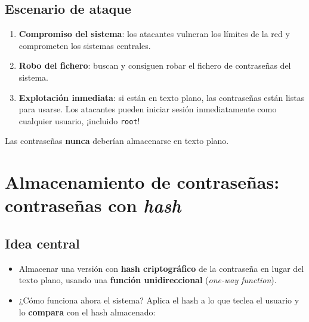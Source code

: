 \documentclass[11pt,a4paper]{report}
\begin{document}
\subsection{Escenario de ataque}
\begin{enumerate}[label=\textbf{0\arabic*.}]
  \item \textbf{Compromiso del sistema}: los atacantes vulneran los límites de la red y comprometen los sistemas centrales.
  \item \textbf{Robo del fichero}: buscan y consiguen robar el fichero de contraseñas del sistema.
  \item \textbf{Explotación inmediata}: si están en texto plano, las contraseñas están listas para usarse. Los atacantes pueden iniciar sesión inmediatamente como cualquier usuario, ¡incluido \texttt{root}!
\end{enumerate}
 
\begin{importante}[title={Estándar de seguridad crítico}]
Las contraseñas \textbf{nunca} deberían almacenarse en texto plano.
\end{importante}
 
\section{Almacenamiento de contraseñas: contraseñas con \emph{hash}}
 
\subsection{Idea central}
\begin{itemize}
  \item Almacenar una versión con \textbf{hash criptográfico} de la contraseña en lugar del texto plano, usando una \textbf{función unidireccional} (\emph{one-way function}).
  \item ¿Cómo funciona ahora el sistema? Aplica el hash a lo que teclea el usuario y lo \textbf{compara} con el hash almacenado:
\end{itemize}
 
\begin{center}
\end{center}
 
\end{document}

